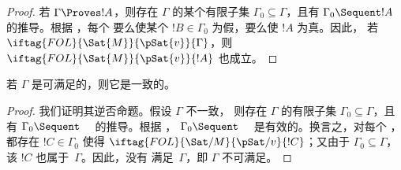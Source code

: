 \documentclass[../../../include/open-logic-section]{subfiles}
\begin{document}
\begin{proof}
若 $\Gamma \Proves !A$，则存在 $\Gamma$ 的某个有限子集 $\Gamma_0 \subseteq
\Gamma$，且有 $\Gamma_0 \Sequent !A$ 的推导。根据
，每个
要么使某个 $!B \in \Gamma_0$ 为假，要么使 $!A$ 为真。因此，
若 $\iftag{FOL}{\Sat{M}}{\pSat{v}}{\Gamma}$，则 $\iftag{FOL}{\Sat{M}}{\pSat{v}}{!A}$ 也成立。
\end{proof}

\begin{cor}
若 $\Gamma$ 是可满足的，则它是一致的。
\end{cor}

\begin{proof}
我们证明其逆否命题。假设 $\Gamma$ 不一致，
则存在 $\Gamma$ 的有限子集 $\Gamma_0 \subseteq \Gamma$，且有
$\Gamma_0 \Sequent \quad$ 的推导。根据 ，
$\Gamma_0 \Sequent \quad$ 是有效的。换言之，对每个
，
都存在 $!C \in \Gamma_0$ 使得
$\iftag{FOL}{\Sat/{M}}{\pSat/{v}}{!C}$；又由于 $\Gamma_0
\subseteq \Gamma$，该 $!C$ 也属于~$\Gamma$。因此，没有
 满足~$\Gamma$，即
$\Gamma$ 不可满足。
\end{proof}
\end{document}
